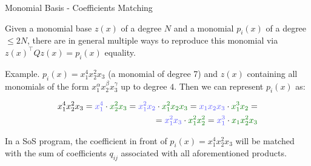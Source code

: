 \documentclass{beamer}
\begin{document}
\begin{frame}{Monomial Basis - Coefficients Matching}
	\begin{flushleft}
		
		Given a monomial base $z(x)$ of a degree $N$ and a monomial $p_i(x)$ of a degree $\leq 2N$, there are in general multiple ways to reproduce this monomial via $z(x)^\top Qz(x) = p_i(x)$ equality. 
		
		\bigskip
		
		Example. $p_i(x) = x_1^4 x_2^2 x_3$ (a monomial of degree 7) and  $z(x)$ containing all monomials of the form $x_1^\alpha x_2^\beta x_3^\gamma$ up to degree $4$. Then we can represent $p_i(x) $ as:
		
		\begin{align*}
			x_1^4 x_2^2 x_3 = 
			\textcolor{myblue}{x_1^4} \cdot \textcolor{mydarkgreen}{x_2^2 x_3} = 
			\textcolor{myblue}{x_1^2 x_2} \cdot \textcolor{mydarkgreen}{x_1^2 x_2 x_3} = 
			\textcolor{myblue}{x_1 x_2 x_3} \cdot \textcolor{mydarkgreen}{x_1^3 x_2} = \\ =
			\textcolor{myblue}{x_1^2 x_3} \cdot \textcolor{mydarkgreen}{x_1^2 x_2^2} = 
			\textcolor{myblue}{x_1^3} \cdot \textcolor{mydarkgreen}{x_1 x_2^2 x_3}
		\end{align*}
		
		In a SoS program, the coefficient in front of $p_i(x) = x_1^4 x_2^2 x_3$ will be matched with the sum of coefficients $q_{ij}$ associated with all aforementioned products.
		
		
	\end{flushleft}
\end{frame}
\end{document}

